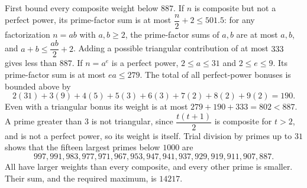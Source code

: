 First bound every composite weight below $887$. If $n$ is composite but not a perfect power, its prime-factor sum is at most $\dfrac{n}{2}+2\le501.5$: for any factorization $n=ab$ with $a,b\ge2$, the prime-factor sums of $a,b$ are at most $a,b$, and $a+b\le\dfrac{ab}{2}+2$. Adding a possible triangular contribution of at most $333$ gives less than $887$. If $n=a^e$ is a perfect power, $2\le a\le31$ and $2\le e\le9$. Its prime-factor sum is at most $ea\le279$. The total of all perfect-power bonuses is bounded above by\[2(31)+3(9)+4(5)+5(3)+6(3)+7(2)+8(2)+9(2)=190.\]Even with a triangular bonus its weight is at most $279+190+333=802<887$. A prime greater than $3$ is not triangular, since $\dfrac{t(t+1)}{2}$ is composite for $t>2$, and is not a perfect power, so its weight is itself. Trial division by primes up to $31$ shows that the fifteen largest primes below $1000$ are\[997,991,983,977,971,967,953,947,941,937,929,919,911,907,887.\]All have larger weights than every composite, and every other prime is smaller. Their sum, and the required maximum, is $\boxed{14217}$.
